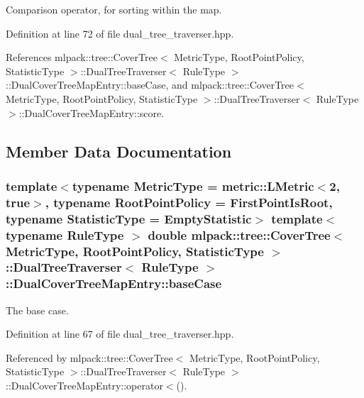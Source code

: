 Comparison operator, for sorting within the map. 



Definition at line 72 of file dual\-\_\-tree\-\_\-traverser.\-hpp.



References mlpack\-::tree\-::\-Cover\-Tree$<$ Metric\-Type, Root\-Point\-Policy, Statistic\-Type $>$\-::\-Dual\-Tree\-Traverser$<$ Rule\-Type $>$\-::\-Dual\-Cover\-Tree\-Map\-Entry\-::base\-Case, and mlpack\-::tree\-::\-Cover\-Tree$<$ Metric\-Type, Root\-Point\-Policy, Statistic\-Type $>$\-::\-Dual\-Tree\-Traverser$<$ Rule\-Type $>$\-::\-Dual\-Cover\-Tree\-Map\-Entry\-::score.



\subsection{Member Data Documentation}
\subsubsection[{base\-Case}]{\setlength{\rightskip}{0pt plus 5cm}template$<$typename Metric\-Type  = metric\-::\-L\-Metric$<$2, true$>$, typename Root\-Point\-Policy  = First\-Point\-Is\-Root, typename Statistic\-Type  = Empty\-Statistic$>$ template$<$typename Rule\-Type $>$ double {\bf mlpack\-::tree\-::\-Cover\-Tree}$<$ Metric\-Type, Root\-Point\-Policy, Statistic\-Type $>$\-::{\bf Dual\-Tree\-Traverser}$<$ Rule\-Type $>$\-::Dual\-Cover\-Tree\-Map\-Entry\-::base\-Case}\label{structmlpack_1_1tree_1_1CoverTree_1_1DualTreeTraverser_1_1DualCoverTreeMapEntry_a5f03e9834ca95e24e13e91b483b98681}


The base case. 



Definition at line 67 of file dual\-\_\-tree\-\_\-traverser.\-hpp.



Referenced by mlpack\-::tree\-::\-Cover\-Tree$<$ Metric\-Type, Root\-Point\-Policy, Statistic\-Type $>$\-::\-Dual\-Tree\-Traverser$<$ Rule\-Type $>$\-::\-Dual\-Cover\-Tree\-Map\-Entry\-::operator$<$().

